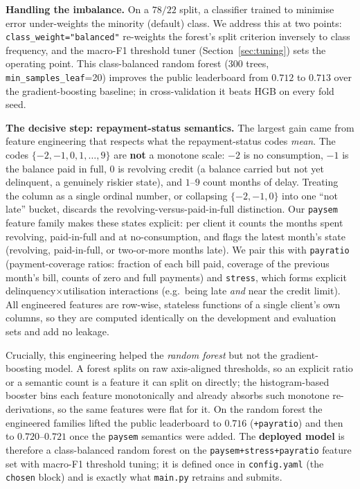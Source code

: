 \documentclass[conference]{IEEEtran}
\begin{document}
\textbf{Handling the imbalance.} On a $78/22$ split, a classifier trained to
minimise error under-weights the minority (default) class. We address this at two
points: \texttt{class\_weight="balanced"} re-weights the forest's split criterion
inversely to class frequency, and the macro-F1 threshold tuner
(Section~\ref{sec:tuning}) sets the operating point. This class-balanced random
forest (300 trees, \texttt{min\_samples\_leaf}=20) improves the public
leaderboard from $0.712$ to $0.713$ over the gradient-boosting baseline; in
cross-validation it beats HGB on every fold seed.

\textbf{The decisive step: repayment-status semantics.} The largest gain came
from feature engineering that respects what the repayment-status codes
\emph{mean}. The codes $\{-2,-1,0,1,\dots,9\}$ are \textbf{not} a monotone scale:
$-2$ is no consumption, $-1$ is the balance paid in full, $0$ is revolving credit
(a balance carried but not yet delinquent, a genuinely riskier state), and
$1$--$9$ count months of delay. Treating the column as a single ordinal number,
or collapsing $\{-2,-1,0\}$ into one ``not late'' bucket, discards the
revolving-versus-paid-in-full distinction. Our \texttt{paysem} feature family
makes these states explicit: per client it counts the months spent revolving,
paid-in-full and at no-consumption, and flags the latest month's state (revolving,
paid-in-full, or two-or-more months late). We pair this with \texttt{payratio}
(payment-coverage ratios: fraction of each bill paid, coverage of the previous
month's bill, counts of zero and full payments) and \texttt{stress}, which forms
explicit delinquency$\times$utilisation interactions (e.g.\ being late
\emph{and} near the credit limit). All engineered features are row-wise,
stateless functions of a single client's own columns, so they are computed
identically on the development and evaluation sets and add no leakage.

Crucially, this engineering helped the \emph{random forest} but not the
gradient-boosting model. A forest splits on raw axis-aligned thresholds, so an
explicit ratio or a semantic count is a feature it can split on directly; the
histogram-based booster bins each feature monotonically and already absorbs such
monotone re-derivations, so the same features were flat for it. On the random
forest the engineered families lifted the public leaderboard to $0.716$
(\texttt{+payratio}) and then to $0.720$--$0.721$ once the \texttt{paysem}
semantics were added. The \textbf{deployed model} is therefore a class-balanced
random forest on the \texttt{paysem+stress+payratio} feature set with macro-F1
threshold tuning; it is defined once in \texttt{config.yaml} (the \texttt{chosen}
block) and is exactly what \texttt{main.py} retrains and submits.
\end{document}
